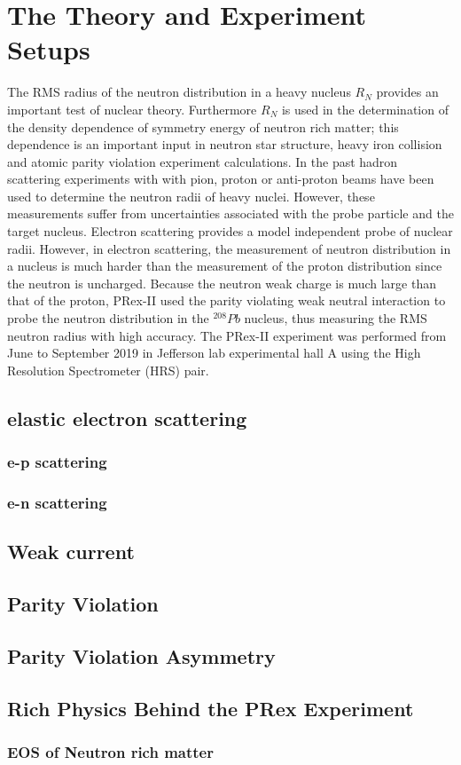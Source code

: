 \chapter{The Theory and Experiment Setups}

The RMS radius of the  neutron distribution in a heavy nucleus  $R_N$ provides an important test of nuclear theory. Furthermore   $R_N$ is used in the determination of  the density dependence of symmetry energy of neutron rich matter; this dependence is an  important input in   neutron star structure, heavy iron collision and atomic parity violation experiment calculations. In the past hadron scattering experiments with with pion, proton or anti-proton beams have been used to determine the neutron radii of heavy nuclei. However, these measurements suffer from uncertainties associated with the probe particle and the target nucleus. Electron scattering provides a model independent probe of nuclear radii.  However, in electron scattering, the measurement of neutron distribution in a nucleus  is much harder than the measurement of the proton distribution  since the neutron is uncharged. Because the  neutron weak charge is much large than that of the proton, PRex-II  used the parity violating weak neutral interaction to probe the neutron distribution in the  ${^{208}}Pb$ nucleus, thus measuring the RMS neutron radius with high  accuracy. The PRex-II experiment was performed from June to September 2019 in Jefferson lab experimental hall A using the High Resolution Spectrometer (HRS) pair. 

\section{elastic electron scattering}



\subsection{e-p scattering}
\subsection{e-n scattering}
\section{Weak current}
\section{Parity Violation}
\section{Parity Violation Asymmetry}
\section{Rich Physics Behind the PRex Experiment}
\subsection{EOS of Neutron rich matter}